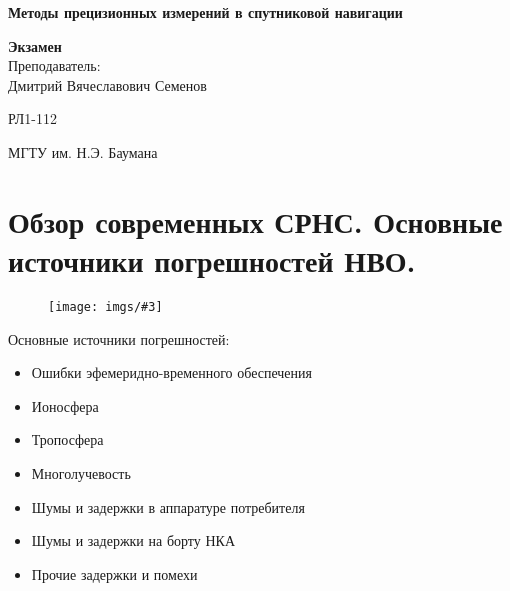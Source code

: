 \documentclass[14pt,a4paper,oneside]{extarticle}
\newcommand{\pic}[3]{
	\begin{figure}[#1]
		\begin{center}
			\texttt{[image: imgs/\#3]}
		\end{center}
	\end{figure}
}
\begin{document}


\begin{titlepage}
    \begin{center}
        \vspace*{1cm}

        \Huge
        \textbf{Методы прецизионных измерений в спутниковой навигации}
        \vspace{1.5cm}

        \vfill
        \Huge
        \textbf{Экзамен}\\
        \vspace{0.5cm}
        \LARGE
        Преподаватель:\\Дмитрий Вячеславович Семенов

        \vspace{1.5cm}

        \vfill

        \LARGE
        РЛ1-112

        \vspace{0.8cm}


        \Large
        МГТУ им. Н.Э. Баумана

    \end{center}
\end{titlepage}

\tableofcontents

\section{Обзор современных СРНС. Основные источники погрешностей НВО.}

\pic{H}{\textwidth}{1}

Основные источники погрешностей:

\begin{itemize}
    \item Ошибки эфемеридно-временного обеспечения
    \item Ионосфера
    \item Тропосфера
    \item Многолучевость
    \item Шумы и задержки в аппаратуре потребителя
    \item Шумы и задержки на борту НКА
    \item Прочие задержки и помехи
\end{itemize}
\end{document}
